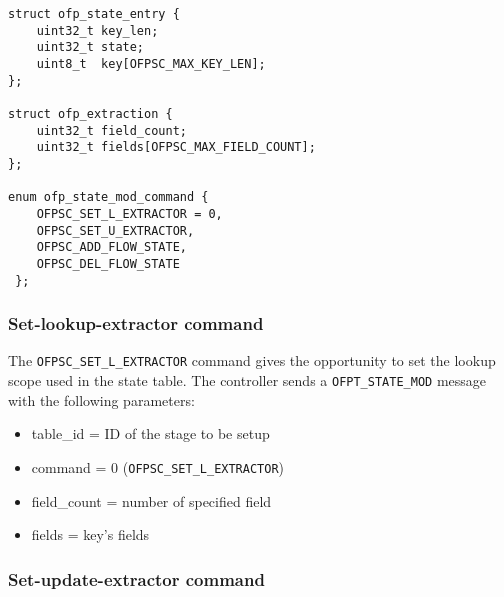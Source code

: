 \begin{verbatim}
struct ofp_state_entry {
    uint32_t key_len;
    uint32_t state;
    uint8_t  key[OFPSC_MAX_KEY_LEN];
};

struct ofp_extraction {
    uint32_t field_count;
    uint32_t fields[OFPSC_MAX_FIELD_COUNT];
};

enum ofp_state_mod_command {
	OFPSC_SET_L_EXTRACTOR = 0,
	OFPSC_SET_U_EXTRACTOR,
	OFPSC_ADD_FLOW_STATE,	
	OFPSC_DEL_FLOW_STATE
 };

\end{verbatim}




\subsubsection{Set-lookup-extractor command}
\label{subsec:set_l_extr}

The \texttt{OFPSC\_SET\_L\_EXTRACTOR} command gives the opportunity to set the lookup scope used in the state table.
The controller sends a \texttt{OFPT\_STATE\_MOD} message with the following parameters:

\begin{itemize}
\item table\_id = ID of the stage to be setup
\item command = 0 (\texttt{OFPSC\_SET\_L\_EXTRACTOR})
\item field\_count = number of specified field 
\item fields = key’s fields
\end{itemize}


\subsubsection{Set-update-extractor command}
\label{subsec:set_u_extr}

